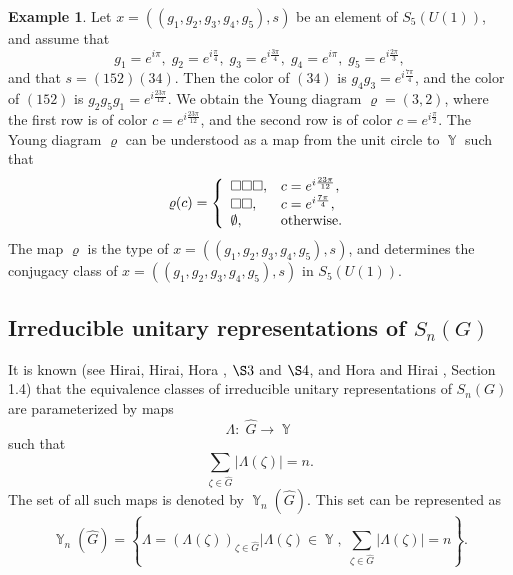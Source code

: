 \documentclass[12pt]{amsart}
\theoremstyle{definition}
\newtheorem{example}[thm]{Example}
\numberwithin{equation}{section}
\DeclareMathOperator{\Y}{\mathbb{Y}}
\begin{document}
\begin{example}Let $x=\left(\left(g_1,g_2,g_3,g_4,g_5\right),s\right)$ be an element of $S_5\left(U(1)\right)$, and assume that
$$
g_1=e^{i\pi},\; g_2=e^{i\frac{\pi}{4}},\;g_3= e^{i\frac{3\pi}{4}},\;
g_4=e^{i\pi},\; g_5=e^{i\frac{2\pi}{3}},
$$
and that $s=(152)(34)$. Then the color of $(34)$ is $g_4g_3=e^{i\frac{7\pi}{4}}$,
and the color of $(152)$ is $g_2g_5g_1=e^{i\frac{23\pi}{12}}$. We obtain
the Young diagram $\varrho=(3,2)$, where the first row is of color $c=e^{i\frac{23\pi}{12}}$, and the second row is of color $c=e^{i\frac{\pi}{2}}$.
The Young diagram $\varrho$ can be understood as a map from the unit circle to $\Y$ such that
$$
\varrho(c)=
\left\{
  \begin{array}{ll}
    \Box\Box\Box, & c=e^{i\frac{23\pi}{12}},\\
    \Box\Box, & c=e^{i\frac{7\pi}{4}}, \\
    \emptyset, & \hbox{otherwise.}
  \end{array}
\right.
$$
The map $\varrho$ is the type of $x=\left(\left(g_1,g_2,g_3,g_4,g_5\right),s\right)$, and determines the conjugacy class of
$x=\left(\left(g_1,g_2,g_3,g_4,g_5\right),s\right)$ in $S_5\left(U(1)\right)$.
\end{example}
\subsection{Irreducible unitary representations of $S_n\left(G\right)$}
It is known (see Hirai, Hirai, Hora \cite{HiraiHiraiHoraI}, $\S 3$ and $\S 4$, and Hora and Hirai \cite{HoraHirai}, Section 1.4) that
the equivalence classes of irreducible unitary representations of $S_n\left(G\right)$ are parameterized by maps
$$
\Lambda:\; \widehat{G}\longrightarrow\Y
$$
such that
$$
\sum\limits_{\zeta\in \widehat{G}}\left|\Lambda(\zeta)\right|=n.
$$
The set of all such maps is denoted by $\Y_n\left(\widehat{G}\right)$. This set can be represented as
\begin{equation}\label{YnG}
\Y_n\left(\widehat{G}\right)=\left\{\Lambda=\left(\Lambda(\zeta)\right)_{\zeta\in\widehat{G}}
\biggl|\Lambda(\zeta)\in\Y,\;\sum\limits_{\zeta\in\widehat{G}}|\Lambda(\zeta)|=n\right\}.
\end{equation}
\end{document}

